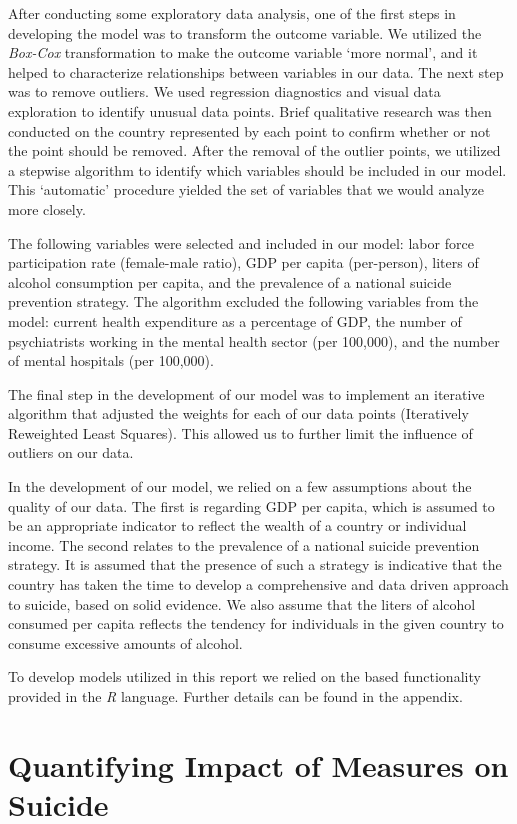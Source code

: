 \documentclass[]{article}
\begin{document}
After conducting some exploratory data analysis, one of the first steps
in developing the model was to transform the outcome variable. We
utilized the \emph{Box-Cox} transformation to make the outcome variable
`more normal', and it helped to characterize relationships between
variables in our data. The next step was to remove outliers. We used
regression diagnostics and visual data exploration to identify unusual
data points. Brief qualitative research was then conducted on the
country represented by each point to confirm whether or not the point
should be removed. After the removal of the outlier points, we utilized
a stepwise algorithm to identify which variables should be included in
our model. This `automatic' procedure yielded the set of variables that
we would analyze more closely.

The following variables were selected and included in our model: labor
force participation rate (female-male ratio), GDP per capita
(per-person), liters of alcohol consumption per capita, and the
prevalence of a national suicide prevention strategy. The algorithm
excluded the following variables from the model: current health
expenditure as a percentage of GDP, the number of psychiatrists working
in the mental health sector (per 100,000), and the number of mental
hospitals (per 100,000).

The final step in the development of our model was to implement an
iterative algorithm that adjusted the weights for each of our data
points (Iteratively Reweighted Least Squares). This allowed us to
further limit the influence of outliers on our data.

In the development of our model, we relied on a few assumptions about
the quality of our data. The first is regarding GDP per capita, which is
assumed to be an appropriate indicator to reflect the wealth of a
country or individual income. The second relates to the prevalence of a
national suicide prevention strategy. It is assumed that the presence of
such a strategy is indicative that the country has taken the time to
develop a comprehensive and data driven approach to suicide, based on
solid evidence. We also assume that the liters of alcohol consumed per
capita reflects the tendency for individuals in the given country to
consume excessive amounts of alcohol.

To develop models utilized in this report we relied on the based
functionality provided in the \emph{R} language. Further details can be
found in the appendix.

\section{Quantifying Impact of Measures on
Suicide}\label{quantifying-impact-of-measures-on-suicide}
\end{document}
